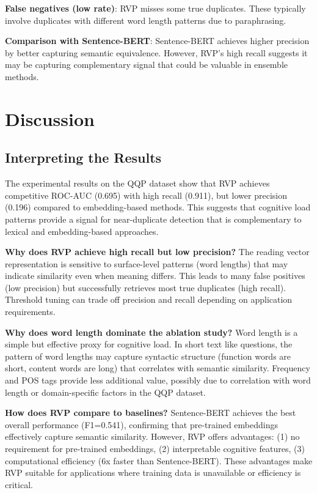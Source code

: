 \documentclass[11pt,letterpaper]{article}
\begin{document}
\textbf{False negatives (low rate)}: RVP misses some true duplicates. These typically involve duplicates with different word length patterns due to paraphrasing.

\textbf{Comparison with Sentence-BERT}: Sentence-BERT achieves higher precision by better capturing semantic equivalence. However, RVP's high recall suggests it may be capturing complementary signal that could be valuable in ensemble methods.

\section{Discussion}

\subsection{Interpreting the Results}

The experimental results on the QQP dataset show that RVP achieves competitive ROC-AUC (0.695) with high recall (0.911), but lower precision (0.196) compared to embedding-based methods. This suggests that cognitive load patterns provide a signal for near-duplicate detection that is complementary to lexical and embedding-based approaches.

\textbf{Why does RVP achieve high recall but low precision?} The reading vector representation is sensitive to surface-level patterns (word lengths) that may indicate similarity even when meaning differs. This leads to many false positives (low precision) but successfully retrieves most true duplicates (high recall). Threshold tuning can trade off precision and recall depending on application requirements.

\textbf{Why does word length dominate the ablation study?} Word length is a simple but effective proxy for cognitive load. In short text like questions, the pattern of word lengths may capture syntactic structure (function words are short, content words are long) that correlates with semantic similarity. Frequency and POS tags provide less additional value, possibly due to correlation with word length or domain-specific factors in the QQP dataset.

\textbf{How does RVP compare to baselines?} Sentence-BERT achieves the best overall performance (F1=0.541), confirming that pre-trained embeddings effectively capture semantic similarity. However, RVP offers advantages: (1) no requirement for pre-trained embeddings, (2) interpretable cognitive features, (3) computational efficiency (6x faster than Sentence-BERT). These advantages make RVP suitable for applications where training data is unavailable or efficiency is critical.
\end{document}
